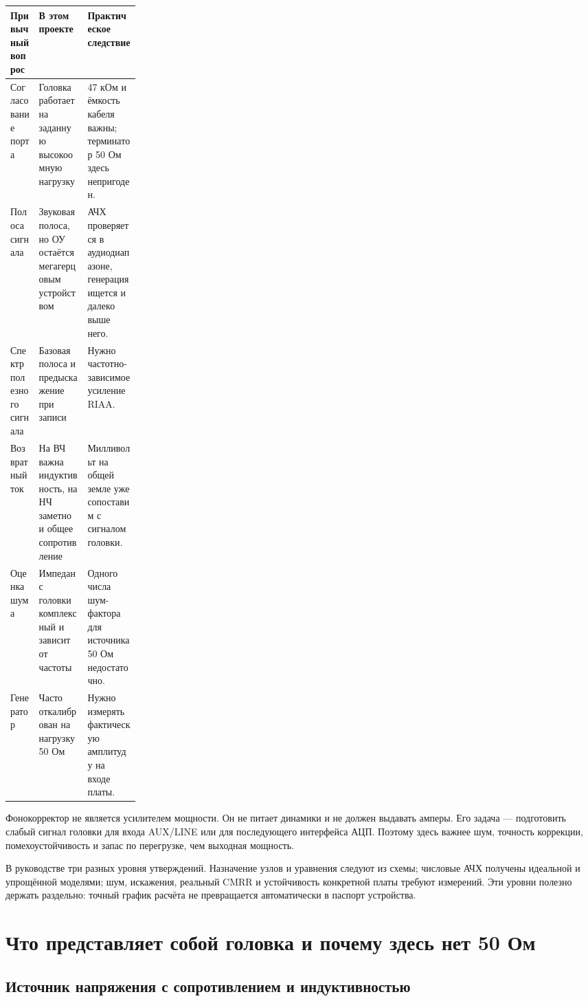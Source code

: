 \documentclass[a4paper,11pt]{article}
\begin{document}
\begin{tabularx}{\linewidth}{@{}L{0.22\linewidth}YY@{}}
\toprule
Привычный вопрос & В этом проекте & Практическое следствие\\
\midrule
Согласование порта & Головка работает на заданную высокоомную нагрузку &
47 кОм и ёмкость кабеля важны; терминатор 50 Ом здесь непригоден.\\
Полоса сигнала & Звуковая полоса, но ОУ остаётся мегагерцовым устройством &
АЧХ проверяется в аудиодиапазоне, генерация ищется и далеко выше него.\\
Спектр полезного сигнала & Базовая полоса и предыскажение при записи &
Нужно частотно-зависимое усиление RIAA.\\
Возвратный ток & На ВЧ важна индуктивность, на НЧ заметно и общее сопротивление &
Милливольт на общей земле уже сопоставим с сигналом головки.\\
Оценка шума & Импеданс головки комплексный и зависит от частоты &
Одного числа шум-фактора для источника 50 Ом недостаточно.\\
Генератор & Часто откалиброван на нагрузку 50 Ом &
Нужно измерять фактическую амплитуду на входе платы.\\
\bottomrule
\end{tabularx}

Фонокорректор не является усилителем мощности. Он не питает динамики и не должен
выдавать амперы. Его задача — подготовить слабый сигнал головки для входа AUX/LINE
или для последующего интерфейса АЦП. Поэтому здесь важнее шум, точность коррекции,
помехоустойчивость и запас по перегрузке, чем выходная мощность.

В руководстве три разных уровня утверждений. Назначение узлов и уравнения следуют
из схемы; числовые АЧХ получены идеальной и упрощённой моделями; шум, искажения,
реальный CMRR и устойчивость конкретной платы требуют измерений.
Эти уровни полезно держать раздельно: точный график расчёта не превращается
автоматически в паспорт устройства.

\section{Что представляет собой головка и почему здесь нет 50 Ом}

\subsection{Источник напряжения с сопротивлением и индуктивностью}
\end{document}
